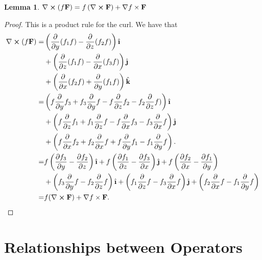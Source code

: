 \documentclass[11pt]{article}
\newtheorem*{lemma*}{Lemma}
\newcommand{\uvec}[1]{\mathop{} \!\hat{\textbf{#1}}}
\renewcommand{\curl}{\nabla \cross}
\renewcommand{\grad}{\nabla}
\begin{document}
\begin{lemma*}
	$\curl (f \mathbf{F}) = f \left( \curl \mathbf{F} \right) + \grad f \times \mathbf{F}$
\end{lemma*}
\begin{adjustwidth}{0.7cm}{}
    \begin{proof}\renewcommand{\qedsymbol}{}
		This is a product rule for the curl. We have that
		\begin{align*}
			\curl (f \mathbf{F}) =& \left( \pdv{y} (f_{1} f) - \pdv{z} (f_{2} f) \right) \uvec{\i} \\
			&+ \left( \pdv{z} (f_{1}f) - \pdv{x} (f_{3}f) \right) \uvec{\j} \\
			&+ \left( \pdv{x} (f_{2}f) + \pdv{y} (f_{1}f) \right) \uvec{k} \\
			=& \left( f \pdv{y} f_{3} + f_{3} \pdv{y} f - f \pdv{z} f_{2} - f_{2} \pdv{z} f) \right) \uvec{\i} \\
			&+ \left( f \pdv{z} f_{1} + f_{1} \pdv{z} f - f \pdv{x} f_{3} - f_{3} \pdv{x} f \right) \uvec{\j} \\
			&+ \left( f \pdv{x} f_{2} + f_{2} \pdv{x} f + f \pdv{y} f_{1} - f_{1} \pdv{y} f \right). \\
			=& f \left( \pdv{f_{3}}{y} - \pdv{f_{2}}{z} \right) \uvec{\i} + f \left( \pdv{f_{1}}{z} - \pdv{f_{3}}{x} \right) \uvec{\j} + f \left( \pdv{f_{2}}{x} - \pdv{f_{1}}{y} \right) \\
			&+ \left( f_{3} \pdv{y} f - f_{2} \pdv{z} f \right) \uvec{\i} + \left( f_{1} \pdv{z} f - f_{3} \pdv{x} f \right) \uvec{\j} + \left( f_{2} \pdv{x} f - f_{1} \pdv{y} f \right) \\
			=& f (\curl \mathbf{F}) + \grad f \times \mathbf{F}.
		\end{align*}
	\end{proof} 
\end{adjustwidth}


\section{Relationships between Operators}
\end{document}
